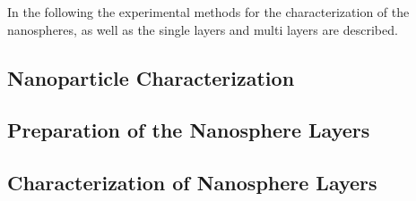\documentclass[\main/dresen_thesis.tex]{subfiles}
\renewcommand{\thisPath}{\main/chapters/looselyPackedNS/experimentalMethods/}
\begin{document}
  In the following the experimental methods for the characterization of the nanospheres, as well as the single layers and multi layers are described.

  \subsection{Nanoparticle Characterization}
    
    \FloatBarrier
    \clearpage
  
  \subsection{Preparation of the Nanosphere Layers}
    
    \FloatBarrier

  \subsection{Characterization of Nanosphere Layers}
  
    \FloatBarrier
\end{document}
